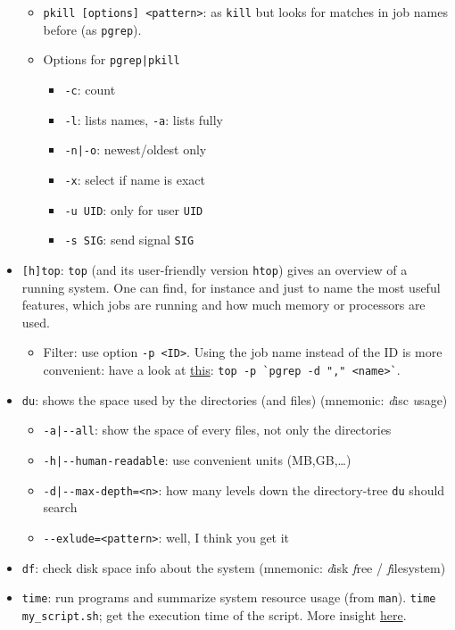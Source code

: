 \documentclass[a4paper,12pt,%
              final%
              ]{article}
\begin{document}
\begin{itemize}
\begin{itemize}
      \item \verb|pkill [options] <pattern>|: as \verb|kill| but looks for matches in job names before (as \verb|pgrep|).
      \item Options for \verb!pgrep|pkill!
        \begin{itemize}
          \item \verb|-c|: count
          \item \verb|-l|: lists names, \verb|-a|: lists fully
          \item \verb!-n|-o!: newest/oldest only
          \item \verb|-x|: select if name is exact
          \item \verb|-u UID|: only for user \verb|UID|
          \item \verb|-s SIG|: send signal \verb|SIG|
        \end{itemize}
    \end{itemize}
  \item \verb|[h]top|: \verb|top| (and its user-friendly version \verb|htop|) gives an overview of a running system. One can find, for instance and just to name the most useful features, which jobs are running and how much memory or processors are used.
    \begin{itemize}
      \item Filter: use option \verb|-p <ID>|. Using the job name instead of the ID is more convenient: have a look at \href{https://unix.stackexchange.com/a/347544}{this}: \verb|top -p `pgrep -d "," <name>`|.
    \end{itemize}
  \item \texttt{du}: shows the space used by the directories (and files) (mnemonic: \emph{d}isc \emph{u}sage)
    \begin{itemize}
      \item \verb!-a|--all!: show the space of every files, not only the directories
      \item \verb!-h|--human-readable!: use convenient units (MB,GB,\ldots)
      \item \verb!-d|--max-depth=<n>!: how many levels down the directory-tree \texttt{du} should search
      \item \verb|--exlude=<pattern>|: well, I think you get it
    \end{itemize}
  \item \texttt{df}: check disk space info about the system (mnemonic: \emph{d}isk \emph{f}ree / \emph{f}ilesystem)
  \item \texttt{time}: run programs and summarize system resource usage (from \texttt{man}). \verb|time my_script.sh|; get the execution time of the script. More insight \href{https://stackoverflow.com/questions/556405/what-do-real-user-and-sys-mean-in-the-output-of-time1/556411#556411}{here}.

\end{itemize}
\end{document}
